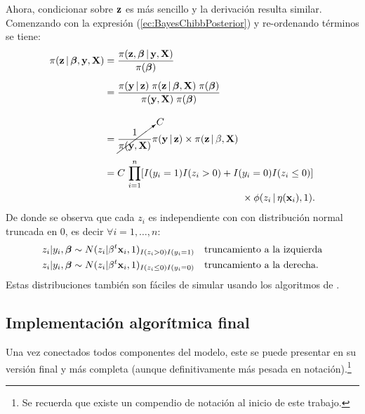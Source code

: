 \documentclass[../Main/Main.tex]{subfiles}
\begin{document}
Ahora, condicionar sobre $\mathbf{z}$ es más sencillo y la derivación resulta similar. Comenzando con la expresión (\ref{ec:BayesChibbPosterior}) y re-ordenando términos se tiene:
\begin{align}
	\pi(\mathbf{z}\,|\,\bm{\beta},\mathbf{y},\mathbf{X})
	& = \dfrac{\pi(\mathbf{z}, \bm{\beta}\,|\,\mathbf{y}, \mathbf{X})}{\pi(\bm{\beta})} \nonumber \\[5pt]
	& = \dfrac{\pi(\mathbf{y}\,|\,\mathbf{z})\;\pi(\mathbf{z}\,|\,\bm{\beta},\mathbf{X}) \; \pi(\bm{\beta})}			{\pi(\mathbf{y}, \mathbf{X}) \; \pi(\bm{\beta})} \nonumber \\[10pt]
	& = \cancelto{C}{\dfrac{1}{\pi(\mathbf{y}, \mathbf{X})}}\pi(\mathbf{y}\,|\,\mathbf{z}) \times \pi(\mathbf{z}\,|\,\beta,\mathbf{X}) \nonumber \\[5pt]
	& = C \, \prod_{i = 1}^n[I(y_i = 1)I(z_i > 0) + I(y_i = 0)I(z_i \leq 0)] \nonumber\\
	&\qquad\qquad\qquad\qquad\qquad\qquad\qquad\times\phi(z_i\,|\,\eta(\mathbf{x}_i),1). \label{ec:BayesChibbZCond}
\end{align}
De donde se observa que cada $z_i$ es independiente con con distribución normal truncada en $0$, es decir $\forall i=1,\ldots,n$:
\begin{align}
	z_i|y_i,\bm{\beta} &\sim N(z_i|\beta^t\mathbf{x}_i,1)_{I(z_i>0)I(y_i = 1)} \quad \text{truncamiento a la izquierda} \label{ec:SimZ}\\
	z_i|y_i,\bm{\beta} &\sim N(z_i|\beta^t\mathbf{x}_i,1)_{I(z_i\leq0)I(y_i = 0)} \quad \text{truncamiento a la derecha}. \nonumber
\end{align}
Estas distribuciones también son fáciles de simular usando los algoritmos de \citet{devroye1986non}.

\subsection{Implementación algorítmica final} \label{sec:ModFinal}
Una vez conectados todos componentes del modelo, este se puede presentar en su versión final y más completa (aunque definitivamente más pesada en notación).\footnote{Se recuerda que existe un compendio de notación al inicio de este trabajo.}
\end{document}
